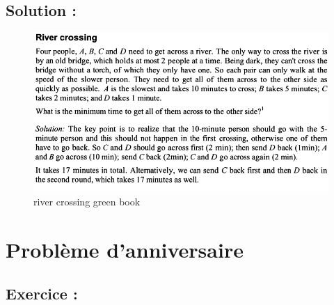 \subsection*{Solution :}

\begin{figure}[H]
    \centering
    \includegraphics[width=0.75\linewidth]{exo_river.png}
    \caption{river crossing green book}
    \label{fig:placeholder}
\end{figure}



\section{Problème d’anniversaire}

\subsection*{Exercice :}


